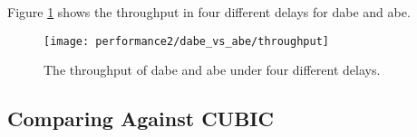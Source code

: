 Figure \ref{fig:dabe_vs_abe_throughput} shows the throughput in four different delays for \gls{dabe} and \gls{abe}.

\begin{figure}[H]
    \centering
    \texttt{[image: performance2/dabe\_vs\_abe/throughput]}
    \captionsetup{width=0.9\linewidth}
    \caption{The throughput of \gls{dabe} and \gls{abe} under four different delays.}
    \label{fig:dabe_vs_abe_throughput}
\end{figure}









\subsection{Comparing Against CUBIC}






